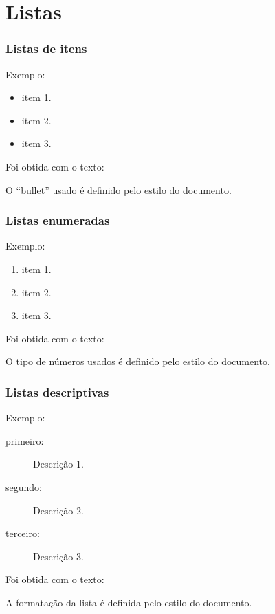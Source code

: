 \documentclass{beamer}
\begin{document}
\section{Listas}
\begin{frame}
  \frametitle{Listas de itens}
  Exemplo:

  \begin{itemize}
  \item item 1.
  \item item 2.
  \item item 3.
  \end{itemize}

  \pause

  Foi obtida com o texto: \qquad
  \pause

  O ``bullet'' usado é definido pelo estilo do documento.
\end{frame}
\begin{frame}
  \frametitle{Listas enumeradas}
  Exemplo:

  \begin{enumerate}
  \item item 1.
  \item item 2.
  \item item 3.
  \end{enumerate}

  \pause
  Foi obtida com o texto: \qquad
  \pause

  O tipo de números usados é definido pelo estilo do documento.
\end{frame}
\begin{frame}
  \frametitle{Listas descriptivas}
  Exemplo:

  \begin{description}
  \item[primeiro:] Descrição 1.
  \item[segundo:] Descrição 2.
  \item[terceiro:] Descrição 3.
  \end{description}

  \pause
  Foi obtida com o texto: \qquad
  \pause

  A formatação da lista é definida pelo estilo do documento.
\end{frame}
\end{document}
